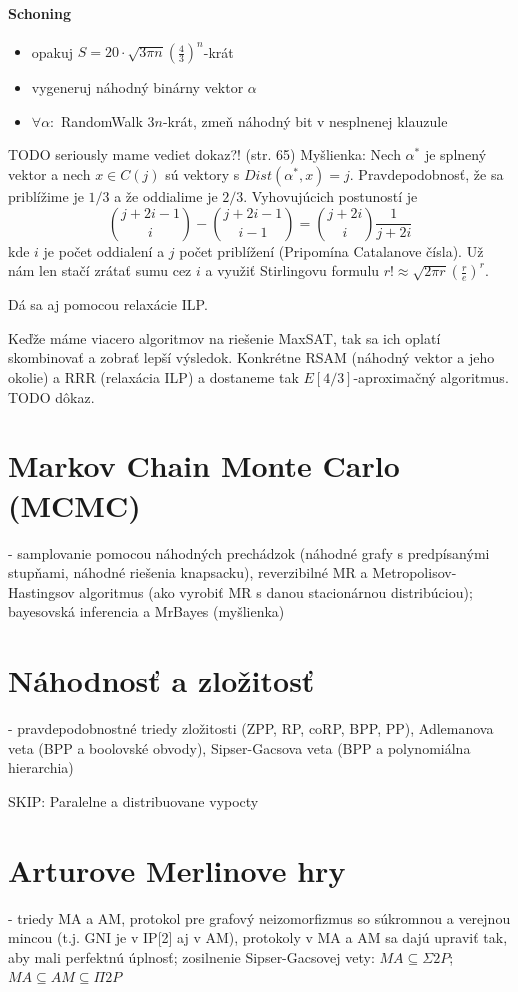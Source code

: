 \documentclass[12pt,a4paper]{article}
\begin{document}
\paragraph{Schoning}
\begin{itemize} 
  \item opakuj $S = 20 \cdot \sqrt{3\pi n}(\frac{4}{3})^n$-krát
  \item vygeneruj náhodný binárny vektor $\alpha$
  \item $\forall \alpha:$ RandomWalk $3n$-krát, zmeň náhodný bit v nesplnenej klauzule
\end{itemize} 
TODO seriously mame vediet dokaz?! (str. 65) 
Myšlienka: Nech $\alpha^{*}$ je splnený vektor a nech $x \in C(j)$ sú vektory s $Dist(\alpha^{*}, x) = j$. Pravdepodobnosť, že sa priblížime je $1/3$ a že oddialime je $2/3$. Vyhovujúcich postuností je
$$
  \binom{j + 2i - 1}{i} - \binom{j + 2i - 1}{i - 1} = \binom{j + 2i}{i}\frac{1}{j + 2i}
$$
kde $i$ je počet oddialení a $j$ počet priblížení (Pripomína Catalanove čísla). Už nám len stačí zrátať sumu cez $i$ a využiť Stirlingovu formulu $r! \approx \sqrt{2\pi r}(\frac{r}{e})^r$. 

Dá sa aj pomocou relaxácie ILP. 

Keďže máme viacero algoritmov na riešenie MaxSAT, tak sa ich oplatí skombinovať a zobrať lepší výsledok. Konkrétne RSAM (náhodný vektor a jeho okolie) a RRR (relaxácia ILP) a dostaneme tak $E[4/3]$-aproximačný algoritmus. TODO dôkaz. 

\section{Markov Chain Monte Carlo (MCMC)}
 - samplovanie pomocou náhodných prechádzok (náhodné grafy s predpísanými stupňami, náhodné riešenia knapsacku), reverzibilné MR a Metropolisov-Hastingsov algoritmus (ako vyrobiť MR s danou stacionárnou distribúciou); bayesovská inferencia a MrBayes (myšlienka)
 

\section{Náhodnosť a zložitosť}
 - pravdepodobnostné triedy zložitosti (ZPP, RP, coRP, BPP, PP), Adlemanova veta (BPP a boolovské obvody), Sipser-Gacsova veta (BPP a polynomiálna hierarchia)
 
 
SKIP: Paralelne a distribuovane vypocty 

\section{Arturove Merlinove hry}
 - triedy MA a AM, protokol pre grafový neizomorfizmus so súkromnou a verejnou mincou (t.j. GNI je v IP[2] aj v AM), protokoly v MA a AM sa dajú upraviť tak, aby mali perfektnú úplnosť; zosilnenie Sipser-Gacsovej vety: $MA \subseteq \Sigma 2P$; $MA \subseteq AM \subseteq \Pi 2P$
 
\end{document}
